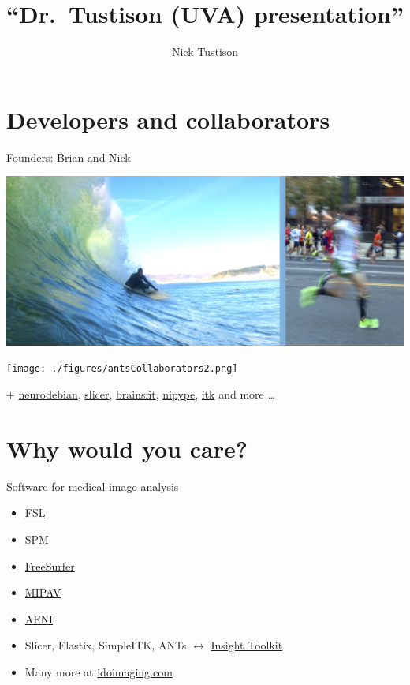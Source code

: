 \documentclass[ignorenonframetext,]{beamer}
\institute{University of Virginia}
\title{``Dr.~Tustison (UVA) presentation''}
\author{Nick Tustison}
\date{}
\begin{document}
\frame{\titlepage}

\section{Developers and
collaborators}\label{developers-and-collaborators}

\begin{frame}{Founders: Brian and Nick}

\includegraphics{./figures/brian_and_nick.png}

\end{frame}

\begin{frame}

\texttt{[image: ./figures/antsCollaborators2.png]}

\(+\) \href{http://neuro.debian.net/pkgs/ants.html}{neurodebian},
\href{http://www.slicer.org/}{slicer},
\href{https://github.com/BRAINSia/BRAINSTools}{brainsfit},
\href{http://nipy.sourceforge.net/nipype/}{nipype},
\href{http://www.itk.org}{itk} and more \ldots{}

\end{frame}

\section{Why would you care?}\label{why-would-you-care}

\begin{frame}{Software for medical image analysis}

\begin{itemize}
\item
  \href{http://fsl.fmrib.ox.ac.uk/fsldownloads/}{FSL}
\item
  \href{http://www.fil.ion.ucl.ac.uk/spm/software/}{SPM}
\item
  \href{http://www.fil.ion.ucl.ac.uk/spm/software/}{FreeSurfer}
\item
  \href{http://mipav.cit.nih.gov}{MIPAV}
\item
  \href{https://afni.nimh.nih.gov/afni}{AFNI}
\item
  Slicer, Elastix, SimpleITK, ANTs \(\longleftrightarrow\)
  \href{http://www.itk.org}{Insight Toolkit}
\item
  Many more at \href{http://idoimaging.com}{idoimaging.com}
\end{itemize}

\end{frame}
\end{document}
